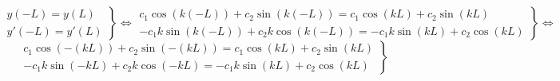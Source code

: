 \begin{solution}
\begin{myitemize}
\[        \left.
          \begin{matrix}
            y(-L)=y(L) \\
            y'(-L)=y'(L)
          \end{matrix} 
        \right\} \Leftrightarrow 
        \left.
          \begin{matrix}
            c_{1} \cos{(k(-L))} + c_{2} \sin{(k(-L))} = c_{1} \cos{(kL)} + 
            c_{2} \sin{(kL)} \\
            - c_{1} k \sin{(k(-L))} + c_{2} k \cos{(k(-L))} = - c_{1}k \sin{(kL)} + 
            c_{2} \cos{(kL)}
          \end{matrix} 
        \right\} \Leftrightarrow 
      \]
      \[
        \left.
          \begin{matrix}
            c_{1} \cos{(-(kL))} + c_{2} \sin{(-(kL))} = c_{1} \cos{(kL)} + c_{2} \sin{(kL)}
            \\
            - c_{1} k \sin{(-kL)} + c_{2} k \cos{(-kL)} = - c_{1}k \sin{(kL)} + 
            c_{2} \cos{(kL)}
          \end{matrix} 
        \right\}
      \]
  \end{myitemize}
\end{solution}







